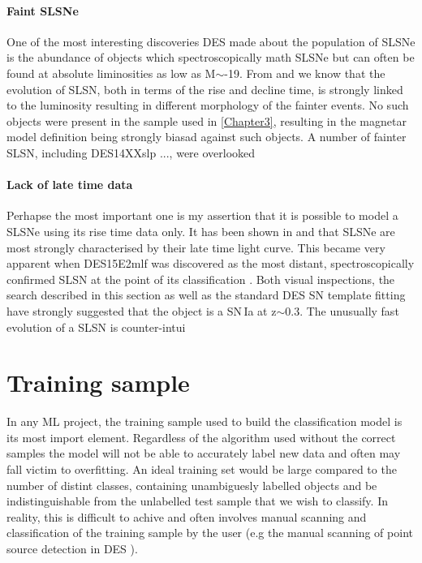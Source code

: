 \paragraph{Faint SLSNe}
One of the most interesting discoveries DES made about the population of SLSNe is the abundance of objects which spectroscopically math SLSNe but can often be found at absolute liminosities as low as M$\sim$-19. From \citet{Inserra2018a} and \citet{Nicholl2014, Nicholl2017} we know that the evolution of SLSN, both in terms of the rise and decline time, is strongly linked to the luminosity resulting in different morphology of the fainter events. No such objects were present in the sample used in \cref{Chapter3}, resulting in the magnetar model definition being strongly biasad against such objects. A number of fainter SLSN, including DES14XXslp ..., were overlooked

\paragraph{Lack of late time data}
 Perhapse the most important one is my assertion that it is possible to model a SLSNe using its rise time data only. It has been shown in \citet{Inserra2013} and \citet{Inserra2018a} that SLSNe are most strongly characterised by their late time light curve. This became very apparent when DES15E2mlf was discovered as the most distant, spectroscopically confirmed SLSN at the point of its classification \citep{Pan2017}. Both visual inspections, the search described in this section as well as the standard DES SN template fitting have strongly suggested that the object is a SN\,Ia at z$\sim$0.3. The unusually fast evolution of a SLSN is counter-intui

\section{Training sample} \label{sec:TrainingSample}
In any ML project, the training sample used to build the classification model is its most import element. Regardless of the algorithm used without the correct samples the model will not be able to accurately label new data and often may fall victim to overfitting. An ideal training set would be large compared to the number of distint classes, containing unambiguesly labelled objects and be indistinguishable from the unlabelled test sample that we wish to classify. In reality, this is difficult to achive and often involves manual scanning and classification of the training sample by the user (e.g the manual scanning of point source detection in DES \citep[][and similar studies]{Goldstein2015}).

